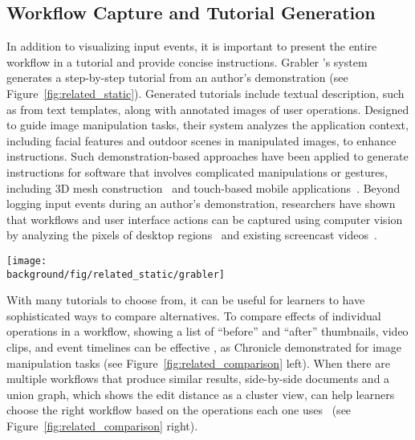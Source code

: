 
\subsection{Workflow Capture and Tutorial Generation}
In addition to visualizing input events, it is important to present the entire workflow in a tutorial and provide concise instructions.
%
Grabler \ea{}'s system~\cite{Grabler:2009jj} generates a step-by-step tutorial from an author's demonstration (see Figure~\ref{fig:related_static}). Generated tutorials include textual description, such as  from text templates, along with annotated images of user operations. Designed to guide image manipulation tasks, their system analyzes the application context, including facial features and outdoor scenes in manipulated images, to enhance instructions.
%
Such demonstration-based approaches have been applied to generate instructions for software that involves complicated manipulations or gestures, including 3D mesh construction~\cite{Denning:2011fy} and touch-based mobile applications~\cite{Wang:2014:EAC:2556288.2557407}.
%
Beyond logging input events during an author's demonstration, researchers have shown that workflows and user interface actions can be captured using computer vision by analyzing the pixels of desktop regions~\cite{Yeh:2009dh,Chang:2011vd} and existing screencast videos~\cite{Banovic:2012kd}.

\begin{figure*}[t!]
  \centering
  \texttt{[image: \\background/fig/related\_static/grabler]}
  \caption{A static tutorial automatically generated by Grabler \ea{}'s system~\cite{Grabler:2009jj}.}
  \label{fig:related_static}
\end{figure*}

With many tutorials to choose from, it can be useful for learners to have sophisticated ways to compare alternatives. To compare effects of individual operations in a workflow, showing a list of ``before'' and ``after'' thumbnails, video clips, and event timelines can be effective \cite{Grossman:2010jz}, as Chronicle demonstrated for image manipulation tasks (see Figure~\ref{fig:related_comparison} left).
%
When there are multiple workflows that produce similar results, side-by-side documents and a union graph, which shows the edit distance as a cluster view, can help learners choose the right workflow based on the operations each one uses~\cite{Kong:2012:DTR:2207676.2208549} (see Figure~\ref{fig:related_comparison} right).

